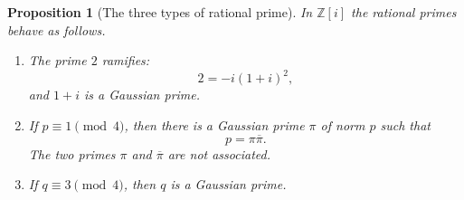 \documentclass[11pt,a4paper]{article}
\numberwithin{equation}{section}
\newtheorem{proposition}[theorem]{Proposition}
\theoremstyle{definition}
\theoremstyle{remark}
\newcommand{\Z}{\mathbb Z}
\newcommand{\Zi}{\Z[i]}
\begin{document}
\begin{proposition}[The three types of rational prime]
\label{prop:prime-types}
In $\Zi$ the rational primes behave as follows.
\begin{enumerate}[label=\textup{(\alph*)}]
 \item The prime $2$ ramifies:
 \begin{equation}
  2=-i(1+i)^2,
  \label{eq:two-ramifies}
 \end{equation}
 and $1+i$ is a Gaussian prime.
 \item If $p\equiv1\pmod4$, then there is a Gaussian prime $\pi$ of norm $p$ such that
 \begin{equation}
  p=\pi\overline\pi.
  \label{eq:p-splits}
 \end{equation}
 The two primes $\pi$ and $\overline\pi$ are not associated.
 \item If $q\equiv3\pmod4$, then $q$ is a Gaussian prime.
\end{enumerate}
\end{proposition}
\end{document}
